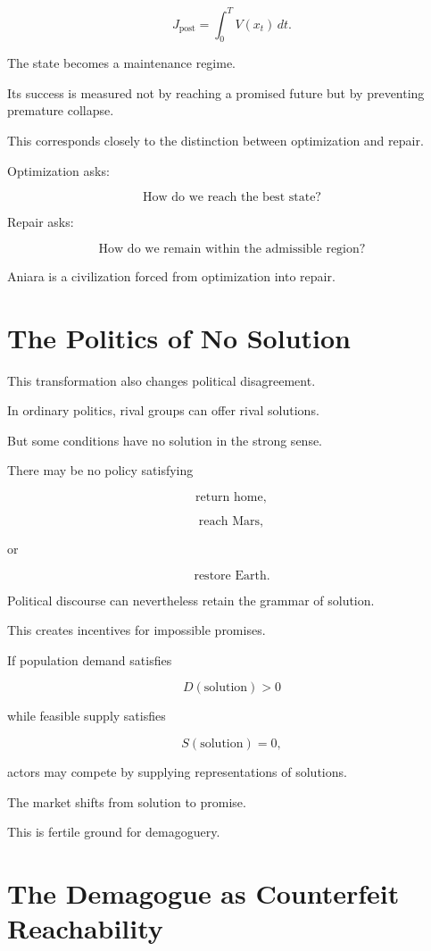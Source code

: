 \documentclass[11pt,oneside]{book}
\theoremstyle{definition}
\theoremstyle{remark}
\begin{document}
\[
J_{\mathrm{post}}
=
\int_0^T
V(x_t)\,dt.
\]

The state becomes a maintenance regime.

Its success is measured not by reaching a promised future but by preventing premature collapse.

This corresponds closely to the distinction between optimization and repair.

Optimization asks:

\[
\text{How do we reach the best state?}
\]

Repair asks:

\[
\text{How do we remain within the admissible region?}
\]

Aniara is a civilization forced from optimization into repair.

\section{The Politics of No Solution}

This transformation also changes political disagreement.

In ordinary politics, rival groups can offer rival solutions.

But some conditions have no solution in the strong sense.

There may be no policy satisfying

\[
\text{return home},
\]

\[
\text{reach Mars},
\]

or

\[
\text{restore Earth}.
\]

Political discourse can nevertheless retain the grammar of solution.

This creates incentives for impossible promises.

If population demand satisfies

\[
D(\text{solution})>0
\]

while feasible supply satisfies

\[
S(\text{solution})=0,
\]

actors may compete by supplying representations of solutions.

The market shifts from solution to promise.

This is fertile ground for demagoguery.

\section{The Demagogue as Counterfeit Reachability}
\end{document}
